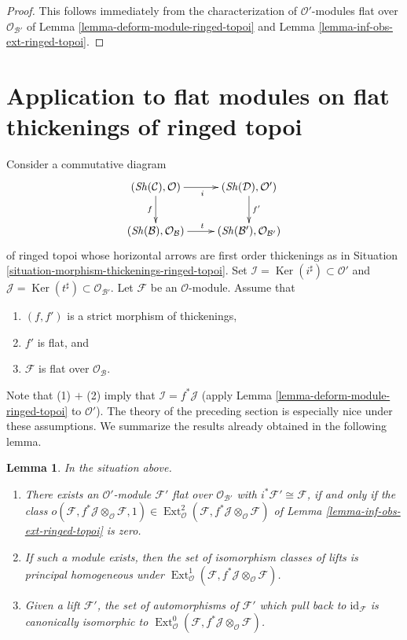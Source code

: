 \documentclass{stacks-project}
\theoremstyle{plain}
\newtheorem{lemma}[subsection]{Lemma}
\theoremstyle{definition}
\theoremstyle{remark}
\numberwithin{equation}{subsection}
\def\Ext{\mathop{\mathrm{Ext}}\nolimits}
\def\Sh{\mathop{\mathit{Sh}}\nolimits}
\def\Ker{\mathop{\mathrm{Ker}}}
\begin{document}
\begin{proof}
This follows immediately from the characterization of
$\mathcal{O}'$-modules flat over $\mathcal{O}_{\mathcal{B}'}$ of 
Lemma \ref{lemma-deform-module-ringed-topoi} and
Lemma \ref{lemma-inf-obs-ext-ringed-topoi}.
\end{proof}






\section{Application to flat modules on flat thickenings of ringed topoi}
\label{section-flat-ringed-topoi}

\noindent
Consider a commutative diagram
$$
\xymatrix{
(\Sh(\mathcal{C}), \mathcal{O}) \ar[r]_i \ar[d]_f &
(\Sh(\mathcal{D}), \mathcal{O}') \ar[d]^{f'} \\
(\Sh(\mathcal{B}), \mathcal{O}_\mathcal{B}) \ar[r]^t &
(\Sh(\mathcal{B}'), \mathcal{O}_{\mathcal{B}'})
}
$$
of ringed topoi whose horizontal arrows are first order thickenings
as in Situation \ref{situation-morphism-thickenings-ringed-topoi}. Set
$\mathcal{I} = \Ker(i^\sharp) \subset \mathcal{O}'$ and
$\mathcal{J} = \Ker(t^\sharp) \subset \mathcal{O}_{\mathcal{B}'}$.
Let $\mathcal{F}$ be an $\mathcal{O}$-module. Assume that
\begin{enumerate}
\item $(f, f')$ is a strict morphism of thickenings,
\item $f'$ is flat, and
\item $\mathcal{F}$ is flat over $\mathcal{O}_\mathcal{B}$.
\end{enumerate}
Note that (1) $+$ (2) imply that $\mathcal{I} = f^*\mathcal{J}$
(apply Lemma \ref{lemma-deform-module-ringed-topoi} to $\mathcal{O}'$).
The theory of the preceding section is especially nice
under these assumptions. We summarize the results already obtained
in the following lemma.

\begin{lemma}
\label{lemma-flat-ringed-topoi}
In the situation above.
\begin{enumerate}
\item There exists an $\mathcal{O}'$-module $\mathcal{F}'$ flat over
$\mathcal{O}_{\mathcal{B}'}$ with $i^*\mathcal{F}' \cong \mathcal{F}$,
if and only if
the class $o(\mathcal{F}, f^*\mathcal{J} \otimes_\mathcal{O} \mathcal{F}, 1)
\in \Ext^2_\mathcal{O}(
\mathcal{F}, f^*\mathcal{J} \otimes_\mathcal{O} \mathcal{F})$
of Lemma \ref{lemma-inf-obs-ext-ringed-topoi} is zero.
\item If such a module exists, then the set of isomorphism classes
of lifts is principal homogeneous under
$\Ext^1_\mathcal{O}(
\mathcal{F}, f^*\mathcal{J} \otimes_\mathcal{O} \mathcal{F})$.
\item Given a lift $\mathcal{F}'$, the set of automorphisms of
$\mathcal{F}'$ which pull back to $\text{id}_\mathcal{F}$ is canonically
isomorphic to $\Ext^0_\mathcal{O}(
\mathcal{F}, f^*\mathcal{J} \otimes_\mathcal{O} \mathcal{F})$.
\end{enumerate}
\end{lemma}
\end{document}
